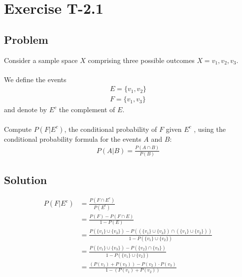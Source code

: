 \section*{Exercise T-2.1}

\subsection*{Problem}
Consider a sample space $X$ comprising three possible outcomes $X = {v_1, v_2, v_3}$.\\ \\
We define the events
\begin{align}
	E = \{v_1,v_2\} \nonumber \\
	F = \{v_1,v_3\}\nonumber 
\end{align}
and denote by $E^c$ the complement of $E$.\\ \\
Compute $P(F|E^c)$, the conditional probability of $F$ given $E^c$ , using the conditional
probability formula for the events $A$ and $B$:\\

\begin{align}
P(A|B)=  \frac{P(A \cap B)}{P(B)} \nonumber 
\end{align}


\subsection*{Solution}

\begin{align}
	P(F|E^c) &= \frac{P(F\cap E^c)}{P(E^c)} \nonumber \\
	&= \frac{P(F) - P(F \cap E)}{1 - P(E)} \nonumber \\
	&= \frac{P( \{v_1\} \cup \{v_3\} ) - P(( \{v_1\} \cup \{v_3\} ) \cap (\{v_1\} \cup \{v_2\}))}{1 - P(\{v_1\} \cup \{v_2\})} \nonumber \\
	&= \frac{P( \{v_1\} \cup \{v_3\} ) - P(\{v_2\} \cap \{v_3\})}{1 - P(\{v_1\} \cup \{v_2\})} \nonumber \\
	&= \frac{(P(v_1) + P(v_3)) - P(v_2)\cdot P(v_3)}{1-(P(v_1)+P(v_2))}\nonumber
\end{align}

